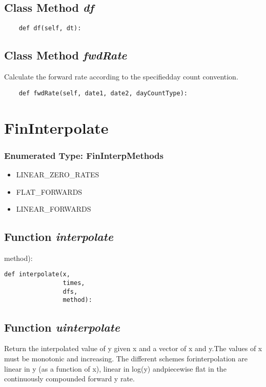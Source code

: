 \documentclass[twoside,11pt]{book}
\begin{document}
\subsection{Class Method {\it df}}


\begin{lstlisting}
    def df(self, dt):
\end{lstlisting}

\subsection{Class Method {\it fwdRate}}
Calculate the forward rate according to the specifiedday count convention. 

\begin{lstlisting}
    def fwdRate(self, date1, date2, dayCountType):
\end{lstlisting}

\newpage
\section{FinInterpolate}

\subsubsection{Enumerated Type: FinInterpMethods}
\begin{itemize}
\item{LINEAR\_ZERO\_RATES}
\item{FLAT\_FORWARDS}
\item{LINEAR\_FORWARDS}
\end{itemize}

\subsection{Function {\it interpolate}}
method):

\begin{lstlisting}
def interpolate(x,
                times,
                dfs,
                method):
\end{lstlisting}

\subsection{Function {\it uinterpolate}}
Return the interpolated value of y given x and a vector of x and y.The values of x must be monotonic and increasing. The different schemes forinterpolation are linear in y (as a function of x), linear in log(y) andpiecewise flat in the continuously compounded forward y rate. 
\end{document}

